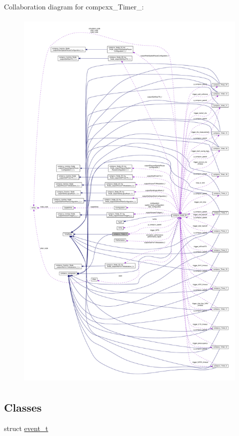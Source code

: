 Collaboration diagram for compcxx\+\_\+\+Timer\+\_\+:\nopagebreak
\begin{figure}[H]
\begin{center}
\leavevmode
\includegraphics[height=550pt]{classcompcxx__Timer__6__coll__graph}
\end{center}
\end{figure}
\subsection*{Classes}
\begin{DoxyCompactItemize}
\item 
struct \hyperlink{structcompcxx__Timer__6_1_1event__t}{event\+\_\+t}
\end{DoxyCompactItemize}
